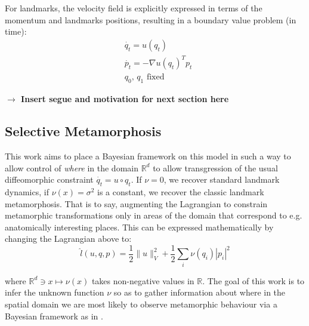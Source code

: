 \documentclass{article}
\newcommand{\half}{\frac 12}
\newcommand{\norm}[2]{\| #1 \|_{ #2 }}
\newcommand{\vnorm}[1]{\norm{ #1 }{V}}
\newcommand{\Rd}{\mathbb{R}^{d}}
\begin{document}
For landmarks, the velocity field is explicitly expressed in terms of the
momentum and landmarks positions, resulting in a boundary value problem (in
time):
\begin{subequations}
\begin{align}
& \dot{q_t} = u(q_t)\\
& \dot{p_t} = - \nabla u(q_t)^T p_t\\
& q_0,\,q_1\text{ fixed}
\end{align}
\end{subequations}

\textbf{$\longrightarrow$ Insert segue and motivation for next section here}

\subsection{Selective Metamorphosis}\label{sec:select_mm}

This work aims to place a Bayesian framework on this model in such a way to
allow control of \emph{where} in the domain $\Rd$ to allow transgression of the
usual diffeomorphic constraint $\dot{q_t} = u\circ q_t$. If $\nu=0$, we recover
standard landmark dynamics, if $\nu(x)=\sigma^2$ is a constant, we recover the
classic landmark metamorphosis. That is to say, augmenting the Lagrangian to
constrain metamorphic transformations only in areas of the domain that
correspond to e.g. anatomically interesting places.  This can be expressed
mathematically by changing the Lagrangian above to:
\[
\hat l(u, q, p) = \half\vnorm{u}^2 + \half\sum_i \nu(q_i)|p_i|^2
\]

where $\Rd\ni x\mapsto\nu (x)$ takes non-negative values in $\mathbb R$. The
goal of this work is to infer the unknown function $\nu$ so as to gather
information about where in the spatial domain we are most likely to observe
metamorphic behaviour via a Bayesian framework as in \cite{dashti2017bayesian}.
\end{document}
